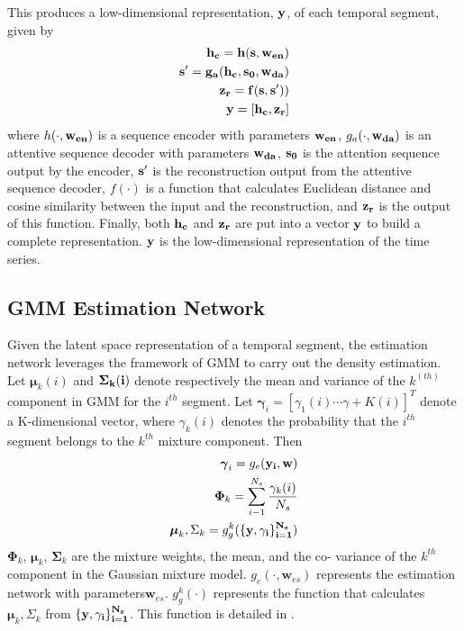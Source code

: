 \documentclass[twoside,twocolumn]{article}
\begin{document}
This produces a low-dimensional representation, $\bf{y}$, of each temporal segment, given by 
\begin{eqnarray}
	\bf{h}_c=h(\bf{s},\bf{w}_{en})\\
	\bf{s}^{\prime}=g_a(\bf{h}_c,\bf{s}_0,\bf{w}_{da})\\
	\bf{z}_r=f(\bf{s},\bf{s}^{\prime}))\\
	\bf{y}=[\bf{h}_c,\bf{z}_r]
	\label{lowDimensionRepresentation}
\end{eqnarray}
where $h(\cdot,\bf{w}_{en})$ is a sequence encoder with parameters $\bf{w}_{en}$, $g_a(\cdot,\bf{w}_{da})$ is an attentive sequence decoder with parameters $\bf{w}_{da}$, $\bf{s}_0$ is the attention sequence output by the encoder, $\bf{s}^{\prime}$ is the reconstruction output from the attentive sequence decoder, $f(\cdot)$ is a function that calculates Euclidean distance and cosine similarity between the input and the reconstruction, and $\bf{z}_r$ is the output of this function.  Finally, both $\bf{h}_c$ and $\bf{z}_r$ are put into a vector $\bf{y}$ to build a complete representation. $\bf{y}$ is the low-dimensional representation of the time series.

\subsection{GMM Estimation Network}

Given the latent space representation of a temporal segment, the estimation network leverages the framework of GMM to carry out the density estimation.  Let $\boldsymbol{\mu}_k(i)$ and $\bf{\Sigma}_k(i)$ denote respectively the mean and variance of the $k^(th)$ component in GMM for the $i^{th}$ segment.  Let $\boldsymbol{\gamma}_i=[\gamma_1(i)\cdots\gamma+K(i)]^T$ denote a K-dimensional vector, where $\gamma_k(i)$ denotes the probability that the $i^{th}$ segment belongs to the $k^{th}$  mixture component.  Then
\begin{eqnarray}
	\boldsymbol{\gamma}_i=g_e(\bf{y}_i,\bf{w})\\
	\boldsymbol{\Phi}_k=\sum_{i-1}^{N_s}\frac{\gamma_k(i)}{N_s}\\
	\boldsymbol{\mu}_k,\Sigma_k=g_g^k(\{\bf{y},\bf{\gamma_i}\}_{i=1}^{N_s})
	\label{GMM}
\end{eqnarray}
$\boldsymbol{\Phi}_k$, $\boldsymbol{\mu}_k$, $\boldsymbol{\Sigma}_k$ are the mixture weights, the mean, and the co- variance of the $k^{th}$ component in the Gaussian mixture model. $g_e(\cdot,\boldsymbol{w}_{es})$ represents the estimation network with parameters$\boldsymbol{w}_{es}$. $g_g^k(\cdot)$ represents the function that calculates $\boldsymbol{\mu}_k,\Sigma_k$ from $\{\bf{y},\bf{\gamma_i}\}_{i=1}^{N_s}$.  This function is detailed in \cite{Yang2015}.
\end{document}
